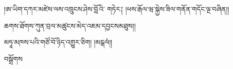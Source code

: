 \documentclass{pecha}
\begin{document}
\LARGE
།ཨ་ཡིག་དཀར་མཛེས་ལས་འཁྲུངས་ཤེས་བློ  འི་
གཏེར༑ །ཕས་རྒོལ་ཝ་སྐྱེས་ཟིལ་གནོན་གདོང་ལྔ་བཞིན།།\par
ཆགས་ཐོགས་ཀུན་བྲལ་མཚུངས་མེད་འཇམ་དབྱངསམཐུས།།\par
མཧཱ་མཁས་པའི་གཙོ་བོ་ཉིད་འགྱུར་ཅིག། །མངྒལཾ༎\par
བསྒྲོགས
\end{document}
